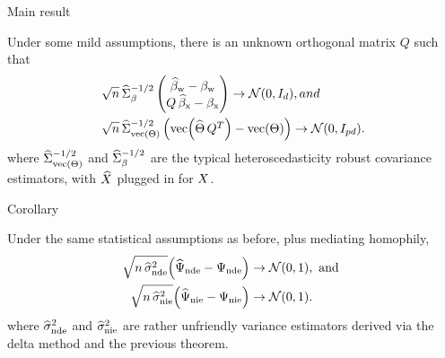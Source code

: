 \documentclass[aspectratio=169]{beamer}
\theoremstyle{remark}
\begin{document}
\begin{frame}{Main result}

    \begin{theorem}

        \vspace{2mm}

        Under some mild assumptions, there is an unknown orthogonal matrix $Q$ such that
        \begin{equation*}
            \begin{aligned}
                \sqrt{ n } \,
                 & \Sigmahatbeta^{-1/2}
                \begin{pmatrix}
                    \betawhat - \betaw \\
                    Q \, \betaxhat - \betax
                \end{pmatrix}
                \to
                \Normal{0}{I_d}, and     \\
                \sqrt{ n } \,
                 & \Sigmahattheta^{-1/2}
                \begin{pmatrix}
                    \vecc \paren*{\Thetahat \, Q^T} - \Thetavec
                \end{pmatrix}
                \to
                \Normal{0}{I_{p d}}.
            \end{aligned}
        \end{equation*}
        \noindent where $\widehat{\Sigma}_{\operatorname*{vec} \left(\Theta\right)}^{-1/2}$ and $\widehat{\Sigma}_\beta^{-1/2}$ are the typical heteroscedasticity robust covariance estimators, with $\widehat{X}$ plugged in for $X$.
    \end{theorem}
\end{frame}

\begin{frame}{Corollary}

    \begin{theorem}

        \vspace{2mm}

        Under the same statistical assumptions as before, plus mediating homophily,
        \begin{align*}
            \sqrt{n \, \sigmahatnde} \paren*{\ndehat - \nde}
             & \to
            \Normal{0}{1}, \text { and } \\
            \sqrt{n \, \sigmahatnie} \paren*{\niehat - \nie}
             & \to
            \Normal{0}{1}.
        \end{align*}
        \noindent where $\widehat{\sigma}^2_\mathrm{nde}$ and $\widehat{\sigma}^2_\mathrm{nie}$ are rather unfriendly variance estimators derived via the delta method and the previous theorem.

    \end{theorem}

\end{frame}
\end{document}
